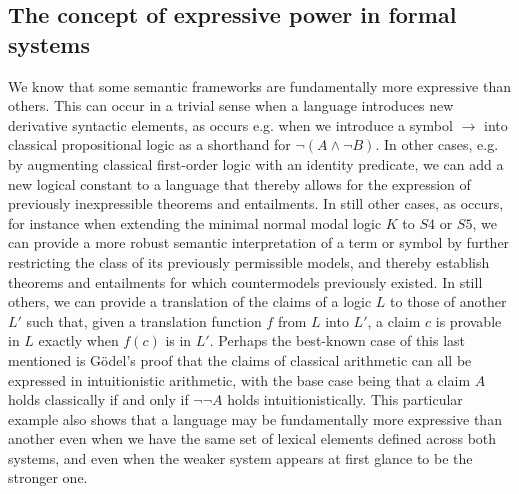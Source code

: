 \documentclass[]{article}
\begin{document}
\subsection{The concept of expressive power in formal systems}
We know that some semantic frameworks are fundamentally more expressive than others. 
This can occur in a trivial sense when a language introduces new derivative syntactic elements, 
as occurs e.g. when we introduce a symbol $\rightarrow$ into classical propositional logic 
as a shorthand for $\neg(A \wedge \neg B)$. 
In other cases, e.g. by augmenting classical first-order logic with an identity predicate, 
we can add a new logical constant to a language that thereby allows for the expression of previously inexpressible theorems and entailments. 
In still other cases, 
as occurs, for instance when extending the minimal normal modal logic $K$ to $S4$ or $S5$, 
we can provide a more robust semantic interpretation of a term or symbol by further restricting the class of its previously permissible models, 
and thereby establish theorems and entailments for which countermodels previously existed.
In still others, we can provide a translation of the claims of a logic $L$ to those of another $L'$ 
such that, 
given a translation function $f$ from $L$ into $L'$, 
a claim $c$ is provable in $L$ exactly when  $f(c)$ is in $L'$.
Perhaps the best-known case of this last mentioned is G\"{o}del's proof that the claims of classical arithmetic can all be expressed in intuitionistic arithmetic, 
with the base case being that a claim $A$ holds classically if and only if $\neg\neg A$ holds intuitionistically. 
This particular example also shows that a language may be fundamentally more expressive than another even when we have the same set of lexical elements defined across both systems, 
and even when the weaker system appears at first glance to be the stronger one. 
\end{document}
